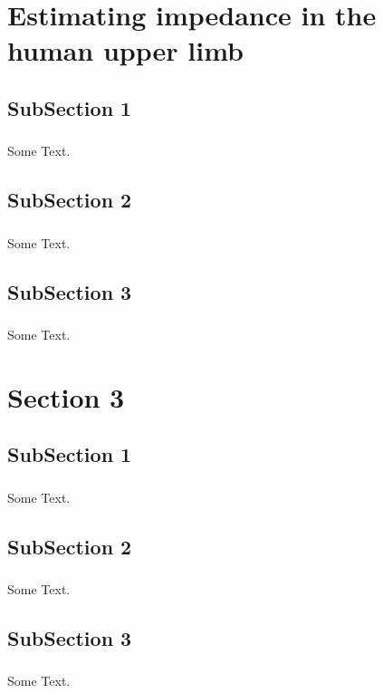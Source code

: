 \documentclass[10pt,xcolor=table]{beamer}
\begin{document}
\section[Impedance meas.]{Estimating impedance in the human upper limb}
\subsection{SubSection 1}

\begin{frame}
\frametitle{\insertsubsection}
Some Text.
\end{frame}

\subsection{SubSection 2}

\begin{frame}
\frametitle{\insertsubsection}
Some Text.
\end{frame}

\subsection{SubSection 3}

\begin{frame}
\frametitle{\insertsubsection}
Some Text.
\end{frame}

\section{Section 3}
\subsection{SubSection 1}

\begin{frame}
\frametitle{\insertsubsection}
Some Text.
\end{frame}

\subsection{SubSection 2}

\begin{frame}
\frametitle{\insertsubsection}
Some Text.
\end{frame}

\subsection{SubSection 3}

\begin{frame}
\frametitle{\insertsubsection}
Some Text.
\end{frame}
\end{document}
